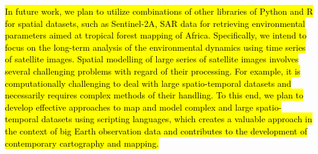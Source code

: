 \documentclass[jimaging,article,submit,pdftex,moreauthors]{Definitions/mdpi}
\begin{document}
\hl{In future work, we plan to utilize combinations of other libraries of Python and R for spatial datasets, such as Sentinel-2A, SAR data for retrieving environmental parameters aimed at tropical forest mapping of Africa. Specifically, we intend to focus on the long-term analysis of the environmental dynamics using time series of satellite images. Spatial modelling of large series of satellite images involves several challenging problems with regard of their processing. For example, it is computationally challenging to deal with large spatio-temporal datasets and necessarily requires complex methods of their handling. To this end, we plan to develop effective approaches to map and model complex and large spatio-temporal datasets using scripting languages, which creates a valuable approach in the context of big Earth observation data and contributes to the development of contemporary cartography and mapping.}
\end{document}
